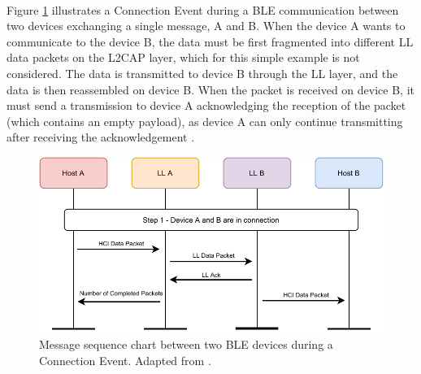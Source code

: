 \paragraph{}  Figure \ref{fig:ble-message-sequence-chart} illustrates a Connection Event during a \acs{BLE} communication between two devices exchanging a single message, A and B. When the device A wants to communicate to the device B, the data must be first fragmented into different \acs{LL} data packets on the \acs{L2CAP} layer, which for this simple example is not considered. The data is transmitted to device B through the \acs{LL} layer, and the data is then reassembled on device B. When the packet is received on device B, it must send a transmission to device A acknowledging the reception of the packet (which contains an empty payload), as device A can only continue transmitting after receiving the acknowledgement \cite{Specification1999}.


\begin{figure}[H]
    \centering
    \includegraphics[width=\linewidth]{images/ble-sending-data.pdf}
    \caption[Message sequence chart between two \acs{BLE} devices during a Connection Event.]{Message sequence chart between two \acs{BLE} devices during a Connection Event. Adapted from \cite{Specification1999}.}
    \label{fig:ble-message-sequence-chart}
\end{figure}

